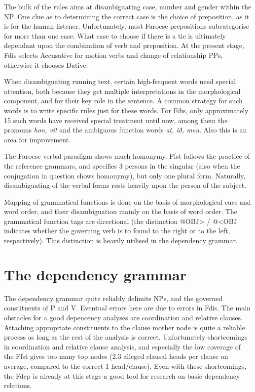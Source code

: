 \documentclass[11pt]{article}
\begin{document}
The bulk of the rules aims at disambiguating case, number and gender within the NP. One clue as to determining the correct case is the choice of preposition, as it is for the human listener. Unfortunately, most Faroese prepositions subcategorise for more than one case. What case to choose if there is a tie is ultimately dependant upon the combination of verb and preposition. At the present stage, Fdis selects Accusative for motion verbs and change of relationship PPs, otherwise it chooses Dative.

When disambiguating running text, certain high-frequent words need special attention, both because they get multiple interpretations in the morphological component, and for their key role in the sentence. A common strategy for such words is to write specific rules just for these words. For Fdis, only approximately 15 such words have received special treatment until now, among them the pronouns \textit{hon, vit} and the ambiguous function words \textit{at, ið, men}. Also this is an area for improvement.

The Faroese verbal paradigm shows much homonymy. Ffst follows the practice of the reference grammars, and specifies 3 persons in the singular (also when the conjugation in question shows homonymy), but only one plural form. Naturally, disambiguating of the verbal forms rests heavily upon the person of the subject. 

Mapping of grammatical functions is done on the basis of morphological cues and word order, and their disambiguation mainly on the basis of word order. The grammatical function tags are directional (the distinction @OBJ> / @<OBJ indicates whether the governing verb is to found to the right or to the left, respectively). This distinction is heavily utilised in the dependency grammar.



\section{The dependency grammar}

The dependency grammar quite reliably delimits NPs, and the governed constituents of P and V. Eventual errors here are due to errors in Fdis. The main obstacles for a good depencency analyses are coordination and relative clauses. Attaching appropriate constituents to the clause mother node is quite a reliable process as long as the rest of the analysis is correct. Unfortunately shortcomings in coordination and relative clause analysis, and especially the low coverage of the Ffst gives too many top nodes (2.3 alleged clausal heads per clause on average, compared to the correct 1 head/clause). Even with these shortcomings, the Fdep is already at this stage a good tool for research on basic dependency relations.
\end{document}

